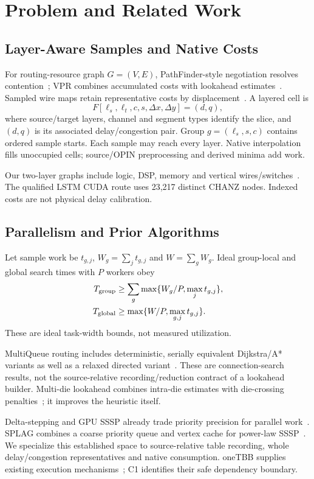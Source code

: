 \section{Problem and Related Work}
\subsection{Layer-Aware Samples and Native Costs}
For routing-resource graph $G=(V,E)$, PathFinder-style negotiation resolves contention~\cite{pathfinder}; VPR combines accumulated costs with lookahead estimates~\cite{vtr8,vtr9}. Sampled wire maps retain representative costs by displacement~\cite{diversity}. A layered cell is
\begin{equation}
F[\ell_s,\ell_t,c,s,\Delta x,\Delta y]=(d,q),
\end{equation}
where source/target layers, channel and segment types identify the slice, and $(d,q)$ is its associated delay/congestion pair. Group $g=(\ell_s,s,c)$ contains ordered sample starts. Each sample may reach every layer. Native interpolation fills unoccupied cells; source/OPIN preprocessing and derived minima add work.

Our two-layer graphs include logic, DSP, memory and vertical wires/switches~\cite{third_dimension,multidie}. The qualified LSTM CUDA route uses 23,217 distinct CHANZ nodes. Indexed costs are not physical delay calibration.

\subsection{Parallelism and Prior Algorithms}
Let sample work be $t_{g,j}$, $W_g=\sum_jt_{g,j}$ and $W=\sum_gW_g$. Ideal group-local and global search times with $P$ workers obey
\begin{align}
T_{\rm group}&\geq\sum_g\max\{W_g/P,\max_jt_{g,j}\},\\
T_{\rm global}&\geq\max\{W/P,\max_{g,j}t_{g,j}\}.
\end{align}
These are ideal task-width bounds, not measured utilization.

MultiQueue routing includes deterministic, serially equivalent Dijkstra/A* variants as well as a relaxed directed variant~\cite{multiqueue}. These are connection-search results, not the source-relative recording/reduction contract of a lookahead builder. Multi-die lookahead combines intra-die estimates with die-crossing penalties~\cite{multidie}; it improves the heuristic itself.

Delta-stepping and GPU SSSP already trade priority precision for parallel work~\cite{delta,gpu_sssp}. SPLAG combines a coarse priority queue and vertex cache for power-law SSSP~\cite{splag}. We specialize this established space to source-relative table recording, whole delay/congestion representatives and native consumption. oneTBB supplies existing execution mechanisms~\cite{tbb}; C1 identifies their safe dependency boundary.

